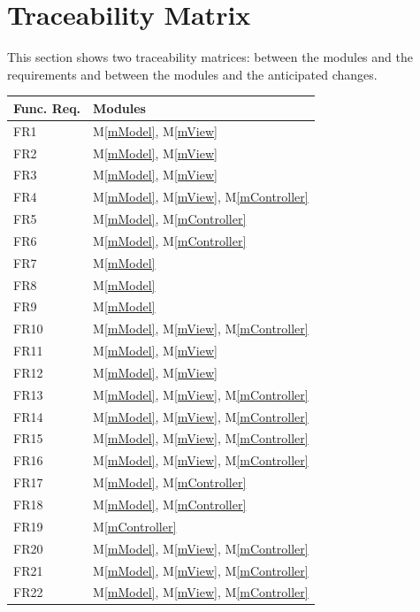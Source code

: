 \documentclass[12pt, titlepage]{article}
\newcommand{\mref}[1]{M\ref{#1}}
\begin{document}


\section{Traceability Matrix} \label{SecTM}

This section shows two traceability matrices: between the modules and the
requirements and between the modules and the anticipated changes.

\begin{table}[H]
\centering
\begin{tabular}{p{} p{}}
\toprule
\textbf{Func. Req.} & \textbf{Modules}\\
\midrule
FR1 & \mref{mModel}, \mref{mView}\\
FR2 & \mref{mModel}, \mref{mView}\\
FR3 & \mref{mModel}, \mref{mView}\\
FR4 & \mref{mModel}, \mref{mView}, \mref{mController}\\
FR5 & \mref{mModel}, \mref{mController}\\
FR6 & \mref{mModel}, \mref{mController}\\
FR7 & \mref{mModel}\\
FR8 & \mref{mModel}\\
FR9 & \mref{mModel}\\
FR10 & \mref{mModel}, \mref{mView}, \mref{mController}\\
FR11 & \mref{mModel}, \mref{mView}\\
FR12 & \mref{mModel}, \mref{mView}\\
FR13 &\mref{mModel}, \mref{mView}, \mref{mController}\\
FR14 & \mref{mModel}, \mref{mView}, \mref{mController}\\
FR15 & \mref{mModel}, \mref{mView}, \mref{mController}\\
FR16 & \mref{mModel}, \mref{mView}, \mref{mController}\\
FR17 & \mref{mModel}, \mref{mController}\\
FR18 & \mref{mModel}, \mref{mController}\\
FR19 & \mref{mController}\\
FR20 & \mref{mModel}, \mref{mView}, \mref{mController}\\
FR21 & \mref{mModel}, \mref{mView}, \mref{mController}\\
FR22 & \mref{mModel}, \mref{mView}, \mref{mController}\\

\end{tabular}
\end{table}
\end{document}
